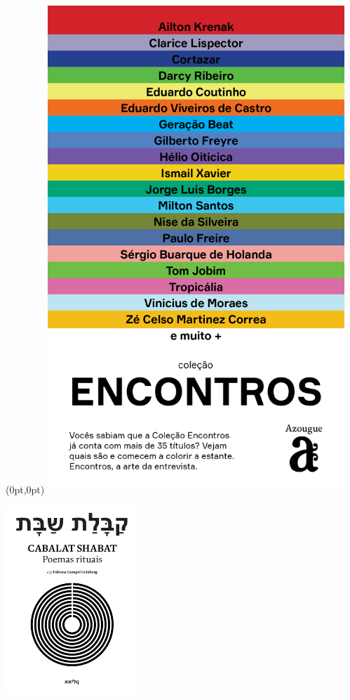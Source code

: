 \pagestyle{ayllon}
\label{ayllon}


\begin{textblock*}{5.625in}(0pt,0pt)%
\vspace*{-1.45cm}
\hspace*{-1.8cm}\includegraphics*[width=112mm]{./imgs/AZOUGUE.png}
\end{textblock*}

\pagebreak

\hspace{.5cm}

\begin{center}
\hspace*{-1cm}
\hspace{1cm}\includegraphics[width=50mm]{./imgs/shabat.png}
\end{center}

